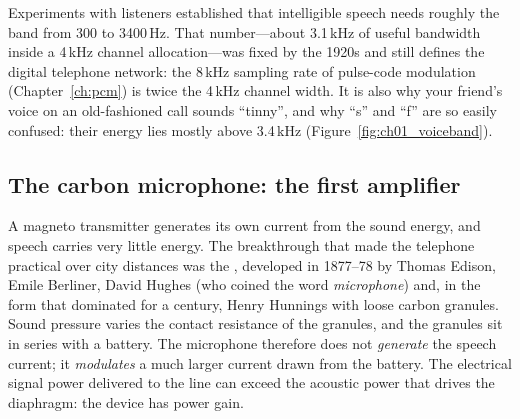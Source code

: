 Experiments with listeners established that intelligible speech needs roughly the band from 300 to
3400\,Hz. That number---about 3.1\,kHz of useful bandwidth inside a 4\,kHz channel allocation---was
fixed by the 1920s and still defines the digital telephone network: the 8\,kHz sampling rate of
pulse-code modulation (Chapter~\ref{ch:pcm}) is twice the 4\,kHz channel width. It is also why your
friend's voice on an old-fashioned call sounds ``tinny'', and why ``s'' and ``f'' are so easily
confused: their energy lies mostly above 3.4\,kHz (Figure~\ref{fig:ch01_voiceband}).



\subsection{The carbon microphone: the first amplifier}

A magneto transmitter generates its own current from the sound energy, and speech carries very
little energy. The breakthrough that made the telephone practical over city distances was the
, developed in 1877--78 by Thomas Edison, Emile Berliner, David Hughes
(who coined the word \emph{microphone}) and, in the form that dominated for a century, Henry
Hunnings with loose carbon granules. Sound pressure varies the contact resistance of the granules,
and the granules sit in series with a battery. The microphone therefore does not \emph{generate} the
speech current; it \emph{modulates} a much larger current drawn from the battery. The electrical
signal power delivered to the line can exceed the acoustic power that drives the diaphragm: the
device has power gain.


